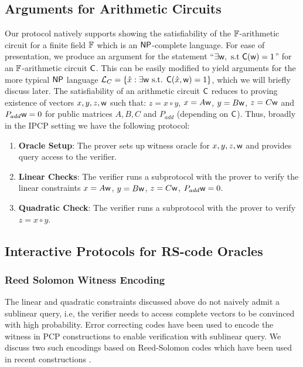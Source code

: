 \subsection{Arguments for Arithmetic Circuits}
Our protocol natively supports showing the satisfiability of the $\mathbb{F}$-arithmetic circuit for a finite field $\mathbb{F}$ which
is an $\mathsf{NP}$-complete language. For ease of presentation, we produce an argument for the statement ``$\exists \mathsf{w}, \text{ s.t } \mathsf{C}(\mathsf{w})=1$'' for an $\mathbb{F}$-arithmetic circuit $\mathsf{C}$. This can be easily modified to yield arguments for the more typical $\mathsf{NP}$ language $\mathcal{L}_C = \{\hat{x} :\exists \mathsf{w} \text{ s.t. } \mathsf{C}(\hat{x},\mathsf{w})=1\}$, which we will briefly discuss later. The satisfiability of an arithmetic circuit $\mathsf{C}$ reduces to proving existence of vectors $x,y,z,\mathsf{w}$ such that:
$z = x \circ y$,
$x = A \mathsf{w}$,
$y = B \mathsf{w}$,
$z = C \mathsf{w}$ and
$P_{add} \mathsf{w} = 0$ for public matrices $A,B,C$ and $P_{add}$ (depending on $\mathsf{C}$). Thus, broadly in the IPCP setting we have the following protocol:
\begin{enumerate}
\item {\bf Oracle Setup}: The prover sets up witness oracle for $x,y,z,\mathsf{w}$ and provides query access to the verifier. 
\item {\bf Linear Checks}: The verifier runs a subprotocol with the prover to verify the linear constraints $x=A \mathsf{w}$, $y=B \mathsf{w}$, $z=C \mathsf{w}$, $P_{add} \mathsf{w} = 0$.
\item {\bf Quadratic Check}: The verifier runs a subprotocol with the prover to verify $z=x\circ y$.
\end{enumerate}

\subsection{Interactive Protocols for RS-code Oracles}
\subsubsection{Reed Solomon Witness Encoding}
The linear and quadratic constraints discussed above do not naively admit a
sublinear query, i.e, the verifier needs to access complete vectors to
be convinced with high probability. Error correcting codes have been used to
encode the witness in PCP constructions to enable verification with sublinear
query. We discuss two such encodings based on Reed-Solomon codes which have
been used in recent constructions \cite{Ligero2017,Aurora,STARK2019}.

